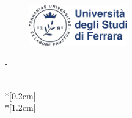 \thispagestyle{empty}             %
\calccentering{\unitlength}
\begin{figure}[h!]
    \hfill\includegraphics[height=1.8cm]{graphics/UniFE}
\end{figure}
\begin{adjustwidth*}{\unitlength}{-\unitlength}
    \begin{adjustwidth}{-0.5cm}{-0.5cm}
        \sffamily
        \begin{flushright}
        \end{flushright}
        \vspace*{\fill}
        \noindent
        \HUGE \thesistitle{}\\*[0.2cm]
        \Huge \thesissubtitle{}\\*[1.2cm]
        \parbox[b]{\linewidth}{%
            \LARGE 
            \normalsize
            \thesislocation{} \the\year
        }
    \end{adjustwidth}
\end{adjustwidth*}
\normalfont
\normalsize
